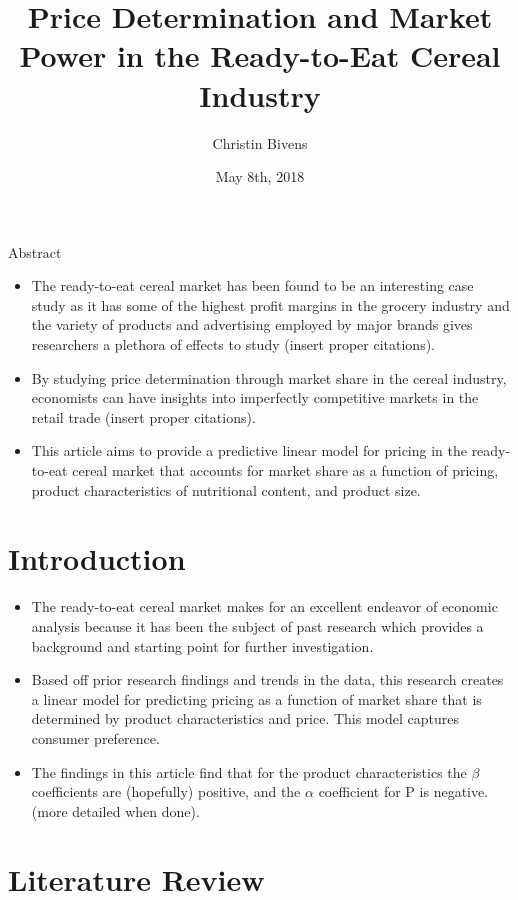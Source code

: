 \documentclass[12pt,english]{article}
\title{Price Determination and Market Power in the Ready-to-Eat Cereal Industry}
\author{Christin Bivens}
\date{May 8th, 2018}
\begin{document}
\maketitle
Abstract

\begin{itemize}

    \item The ready-to-eat cereal market has been found to be an interesting case study as it has some of the highest profit margins in the grocery industry and the variety of products and advertising employed by major brands gives researchers a plethora of effects to study (insert proper citations).
    \item By studying price determination through market share in the cereal industry, economists can have insights into imperfectly competitive markets in the retail trade (insert proper citations).
    \item This article aims to provide a predictive linear model for pricing in the ready-to-eat cereal market that accounts for market share as a function of pricing, product characteristics of nutritional content, and product size.
    
\end{itemize}

\section{Introduction}

\begin{itemize}
    \item The ready-to-eat cereal market makes for an excellent endeavor of economic analysis because it has been the subject of past research which provides a background and starting point for further investigation.
    \item Based off prior research findings and trends in the data, this research creates a linear model for predicting pricing as a function of market share that is determined by product characteristics and price. This model captures consumer preference.
    \item The findings in this article find that for the product characteristics the $\beta$ coefficients are (hopefully) positive, and the $\alpha$ coefficient for P is negative. (more detailed when done).
\end{itemize}

\section{Literature Review}
\end{document}
